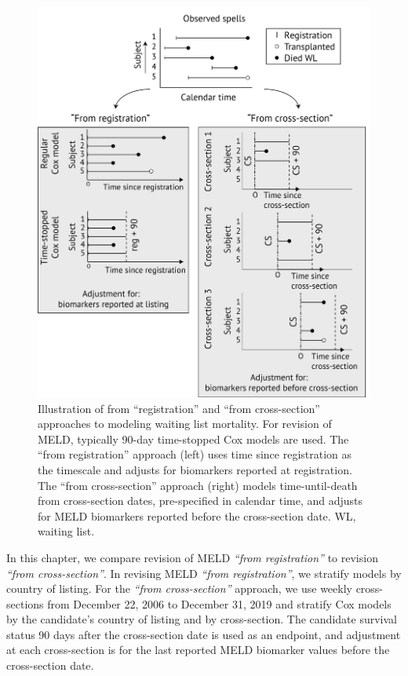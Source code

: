 \documentclass[11pt,twoside,]{book}
\begin{document}
\begin{figure}[h]

{\centering \includegraphics[width=0.87\linewidth]{figures/ch3//figure1} 

}

\caption{Illustration of from “registration” and “from cross-section” approaches to modeling waiting list mortality. For revision of MELD, typically 90-day time-stopped Cox models are used. The “from registration” approach (left) uses time since registration as the timescale and adjusts for biomarkers reported at registration. The “from cross-section” approach (right) models time-until-death from cross-section dates, pre-specified in calendar time, and adjusts for MELD biomarkers reported before the cross-section date. WL, waiting list.}\label{fig:ch3fig1}
\end{figure}

\FloatBarrier
\newpage

In this chapter, we compare revision of MELD \emph{``from
registration''} to revision \emph{``from cross-section''}. In revising MELD
\emph{``from registration''}, we stratify models by country of listing. For the
\emph{``from cross-section''} approach, we use weekly cross-sections from
December 22, 2006 to December 31, 2019 and stratify Cox models by the
candidate's country of listing and
by cross-section. The candidate survival status 90 days after the cross-section date is
used as an endpoint, and adjustment at each cross-section is for the
last reported MELD biomarker values before the cross-section date.
\end{document}
